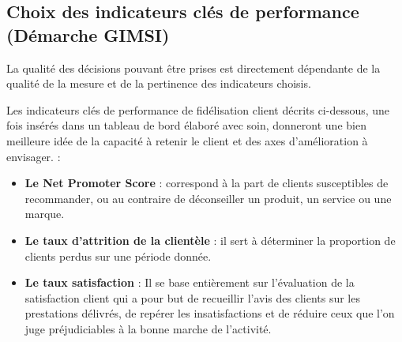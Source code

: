     \subsection[Choix des indicateurs cles de performance (Démarche GIMSI)]{Choix des indicateurs clés de performance (Démarche GIMSI)}
    La qualité des décisions pouvant être prises est directement dépendante
    de la qualité de la mesure et de la pertinence des indicateurs choisis.
    \par
    Les indicateurs clés de performance de fidélisation client décrits
    ci-dessous, une fois insérés dans un tableau de bord élaboré avec soin,
    donneront une bien meilleure idée de la capacité à retenir le client et
    des axes d’amélioration à envisager. \cite*{JadeWin} :
    \par
    \begin{itemize}
        \setlength{\itemsep}{0pt}
        \item [\ding{226}] \textbf{Le Net Promoter Score} : correspond à
        la part de clients susceptibles de recommander, ou au contraire
        de déconseiller un produit, un service ou une marque.
        \item [\ding{226}] \textbf{Le taux d’attrition de la clientèle} : il sert à déterminer la proportion
        de clients perdus sur une période donnée.
        \item [\ding{226}] \textbf{Le taux satisfaction} : Il se base entièrement 
        sur l’évaluation de la satisfaction client qui a pour but de
        recueillir l’avis des clients sur les prestations délivrés, de repérer les
        insatisfactions et de réduire ceux que l’on juge préjudiciables
        à la bonne marche de l’activité.
    \end{itemize}
